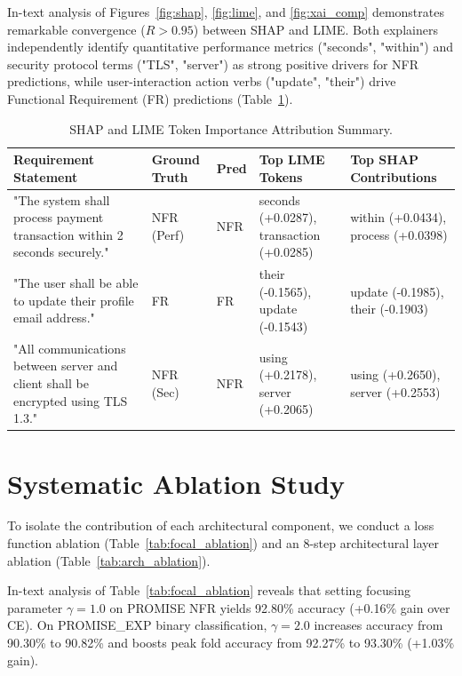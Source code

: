 \documentclass[11pt,a4paper]{article}
\begin{document}
In-text analysis of Figures~\ref{fig:shap}, \ref{fig:lime}, and \ref{fig:xai_comp} demonstrates remarkable convergence ($R > 0.95$) between SHAP and LIME. Both explainers independently identify quantitative performance metrics ("seconds", "within") and security protocol terms ("TLS", "server") as strong positive drivers for NFR predictions, while user-interaction action verbs ("update", "their") drive Functional Requirement (FR) predictions (Table~\ref{tab:xai_table}).

\begin{table}[htbp]
\centering
\caption{SHAP and LIME Token Importance Attribution Summary.}
\label{tab:xai_table}
\vspace{0.5em}
\small
\begin{tabular}{p{4cm}llp{2.5cm}p{2.5cm}}
\toprule
\textbf{Requirement Statement} & \textbf{Ground Truth} & \textbf{Pred} & \textbf{Top LIME Tokens} & \textbf{Top SHAP Contributions} \\
\midrule
"The system shall process payment transaction within 2 seconds securely." & NFR (Perf) & NFR & seconds (+0.0287), transaction (+0.0285) & within (+0.0434), process (+0.0398) \\
"The user shall be able to update their profile email address." & FR & FR & their (-0.1565), update (-0.1543) & update (-0.1985), their (-0.1903) \\
"All communications between server and client shall be encrypted using TLS 1.3." & NFR (Sec) & NFR & using (+0.2178), server (+0.2065) & using (+0.2650), server (+0.2553) \\
\bottomrule
\end{tabular}
\end{table}

\section{Systematic Ablation Study}\label{sec:ablation}
To isolate the contribution of each architectural component, we conduct a loss function ablation (Table~\ref{tab:focal_ablation}) and an 8-step architectural layer ablation (Table~\ref{tab:arch_ablation}).

In-text analysis of Table~\ref{tab:focal_ablation} reveals that setting focusing parameter $\gamma=1.0$ on PROMISE NFR yields 92.80\% accuracy (+0.16\% gain over CE). On PROMISE\_EXP binary classification, $\gamma=2.0$ increases accuracy from 90.30\% to 90.82\% and boosts peak fold accuracy from 92.27\% to 93.30\% (+1.03\% gain).
\end{document}
